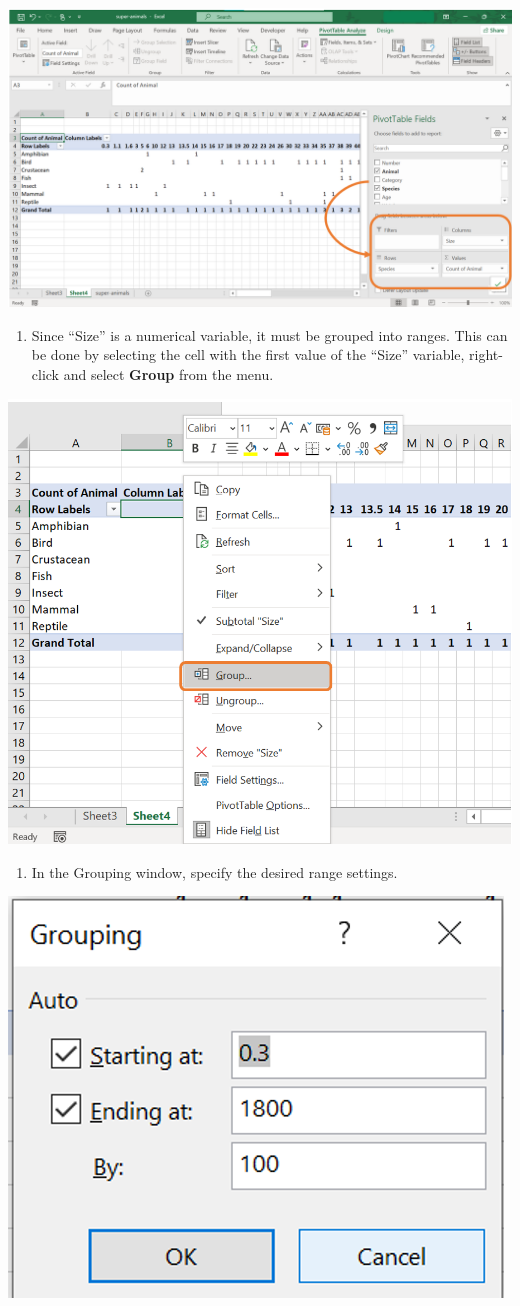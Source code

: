 \documentclass[
]{book}
\providecommand{\tightlist}{%
  \setlength{\itemsep}{0pt}\setlength{\parskip}{0pt}}
\begin{document}
\begin{center}\includegraphics[width=0.8\linewidth]{Figures/pivot_5} \end{center}

\begin{enumerate}
\def\labelenumi{\arabic{enumi}.}
\setcounter{enumi}{2}
\tightlist
\item
  Since ``Size'' is a numerical variable, it must be grouped into ranges. This can be done by selecting the cell with the first value of the ``Size'' variable, right-click and select \textbf{Group} from the menu.
\end{enumerate}

\begin{center}\includegraphics[width=0.6\linewidth]{Figures/pivot_6} \end{center}

\begin{enumerate}
\def\labelenumi{\arabic{enumi}.}
\setcounter{enumi}{3}
\tightlist
\item
  In the Grouping window, specify the desired range settings.
\end{enumerate}

\begin{center}\includegraphics[width=0.4\linewidth]{Figures/pivot_7} \end{center}
\end{document}
